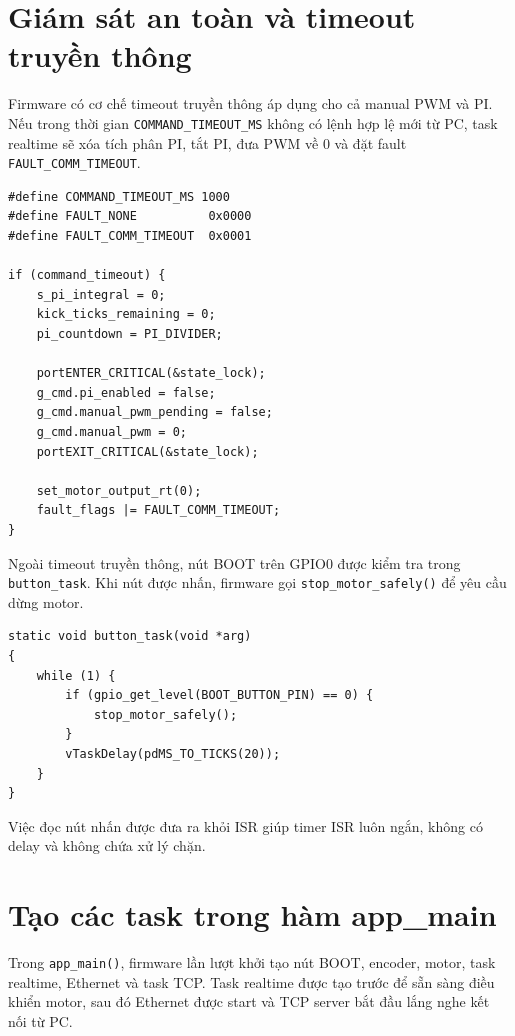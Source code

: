 \documentclass[12pt,a4paper]{report}
\begin{document}
\section{Giám sát an toàn và timeout truyền thông}

Firmware có cơ chế timeout truyền thông áp dụng cho cả manual PWM và PI. Nếu trong thời gian \texttt{COMMAND\_TIMEOUT\_MS} không có lệnh hợp lệ mới từ PC, task realtime sẽ xóa tích phân PI, tắt PI, đưa PWM về 0 và đặt fault \texttt{FAULT\_COMM\_TIMEOUT}.

\begin{lstlisting}
#define COMMAND_TIMEOUT_MS 1000
#define FAULT_NONE          0x0000
#define FAULT_COMM_TIMEOUT  0x0001

if (command_timeout) {
    s_pi_integral = 0;
    kick_ticks_remaining = 0;
    pi_countdown = PI_DIVIDER;

    portENTER_CRITICAL(&state_lock);
    g_cmd.pi_enabled = false;
    g_cmd.manual_pwm_pending = false;
    g_cmd.manual_pwm = 0;
    portEXIT_CRITICAL(&state_lock);

    set_motor_output_rt(0);
    fault_flags |= FAULT_COMM_TIMEOUT;
}
\end{lstlisting}

Ngoài timeout truyền thông, nút BOOT trên GPIO0 được kiểm tra trong \texttt{button\_task}. Khi nút được nhấn, firmware gọi \texttt{stop\_motor\_safely()} để yêu cầu dừng motor.

\begin{lstlisting}
static void button_task(void *arg)
{
    while (1) {
        if (gpio_get_level(BOOT_BUTTON_PIN) == 0) {
            stop_motor_safely();
        }
        vTaskDelay(pdMS_TO_TICKS(20));
    }
}
\end{lstlisting}

Việc đọc nút nhấn được đưa ra khỏi ISR giúp timer ISR luôn ngắn, không có delay và không chứa xử lý chặn.

\section{Tạo các task trong hàm app\_main}

Trong \texttt{app\_main()}, firmware lần lượt khởi tạo nút BOOT, encoder, motor, task realtime, Ethernet và task TCP. Task realtime được tạo trước để sẵn sàng điều khiển motor, sau đó Ethernet được start và TCP server bắt đầu lắng nghe kết nối từ PC.
\end{document}
